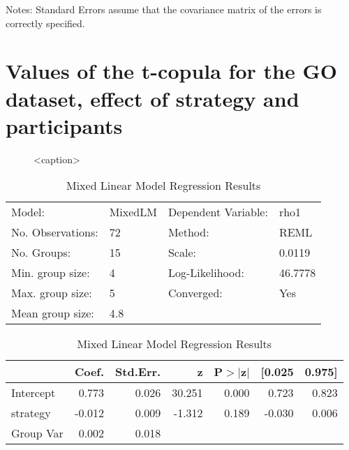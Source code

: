 \documentclass{article}
\begin{document}
Notes: \newline
[1] Standard Errors assume that the covariance matrix of the errors is correctly specified.


\section{Values of the t-copula for the GO dataset, effect of strategy and participants}

\begin{figure}[htbp]
    \centering
    \caption{<caption>}
    \label{<label>}
\end{figure}

\begin{table}
    \caption{Mixed Linear Model Regression Results}
    \label{}
    \begin{center}
        \begin{tabular}{llll}
            \hline
            Model:            & MixedLM & Dependent Variable: & rho1    \\
            No. Observations: & 72      & Method:             & REML    \\
            No. Groups:       & 15      & Scale:              & 0.0119  \\
            Min. group size:  & 4       & Log-Likelihood:     & 46.7778 \\
            Max. group size:  & 5       & Converged:          & Yes     \\
            Mean group size:  & 4.8     &                     &         \\
            \hline
        \end{tabular}
    \end{center}

    \begin{center}
        \begin{tabular}{lrrrrrr}
            \hline
                      & Coef.  & Std.Err. & z      & P$> |$z$|$ & [0.025 & 0.975] \\
            \hline
            Intercept & 0.773  & 0.026    & 30.251 & 0.000      & 0.723  & 0.823  \\
            strategy  & -0.012 & 0.009    & -1.312 & 0.189      & -0.030 & 0.006  \\
            Group Var & 0.002  & 0.018    &        &            &        &        \\
            \hline
        \end{tabular}
    \end{center}
\end{table}
\end{document}
